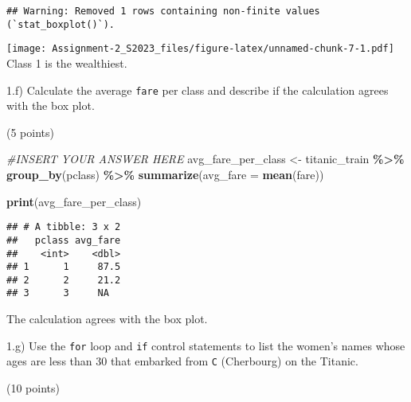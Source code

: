 \documentclass[
]{article}
\newenvironment{Shaded}{\begin{snugshade}}{\end{snugshade}}
\newcommand{\AttributeTok}[1]{\textcolor[rgb]{0.13,0.29,0.53}{#1}}
\newcommand{\CommentTok}[1]{\textcolor[rgb]{0.56,0.35,0.01}{\textit{#1}}}
\newcommand{\FunctionTok}[1]{\textcolor[rgb]{0.13,0.29,0.53}{\textbf{#1}}}
\newcommand{\NormalTok}[1]{#1}
\newcommand{\OtherTok}[1]{\textcolor[rgb]{0.56,0.35,0.01}{#1}}
\newcommand{\SpecialCharTok}[1]{\textcolor[rgb]{0.81,0.36,0.00}{\textbf{#1}}}
\begin{document}
\begin{verbatim}
## Warning: Removed 1 rows containing non-finite values (`stat_boxplot()`).
\end{verbatim}

\texttt{[image: Assignment-2\_S2023\_files/figure-latex/unnamed-chunk-7-1.pdf]}
Class 1 is the wealthiest.

1.f) Calculate the average \texttt{fare} per class and describe if the
calculation agrees with the box plot.

(5 points)

\begin{Shaded}
\begin{Highlighting}[]
\CommentTok{\#INSERT YOUR ANSWER HERE}
\NormalTok{avg\_fare\_per\_class }\OtherTok{\textless{}{-}}\NormalTok{ titanic\_train }\SpecialCharTok{\%\textgreater{}\%} \FunctionTok{group\_by}\NormalTok{(pclass) }\SpecialCharTok{\%\textgreater{}\%} \FunctionTok{summarize}\NormalTok{(}\AttributeTok{avg\_fare =} \FunctionTok{mean}\NormalTok{(fare))}

\FunctionTok{print}\NormalTok{(avg\_fare\_per\_class)}
\end{Highlighting}
\end{Shaded}

\begin{verbatim}
## # A tibble: 3 x 2
##   pclass avg_fare
##    <int>    <dbl>
## 1      1     87.5
## 2      2     21.2
## 3      3     NA
\end{verbatim}

The calculation agrees with the box plot.

1.g) Use the \texttt{for} loop and \texttt{if} control statements to
list the women's names whose ages are less than 30 that embarked from
\texttt{C} (Cherbourg) on the Titanic.

(10 points)
\end{document}
